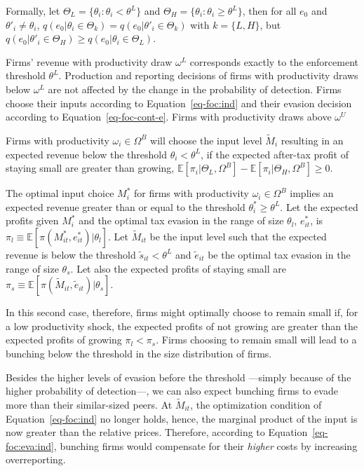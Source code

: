 \documentclass[
  12pt]{article}
\begin{document}
Formally, let \(\Theta_{L} = \{\theta_i : \theta_{i} < \theta^L \}\) and
\(\Theta_{H} = \{\theta_i : \theta_{i} \ge \theta^L \}\), then for all
\(e_0\) and \(\theta'_i\not=\theta_i\),
\(q(e_0|\theta_i \in \Theta_k)=q(e_0|\theta'_i \in \Theta_k)\) with
\(k=\{L,H\}\), but
\(q(e_0|\theta'_i \in \Theta_H)\ge q(e_0|\theta_i \in \Theta_L)\).

Firms' revenue with productivity draw \(\omega^L\) corresponds exactly
to the enforcement threshold \(\theta^L\). Production and reporting
decisions of firms with productivity draws below \(\omega^L\) are not
affected by the change in the probability of detection. Firms choose
their inputs according to Equation~\ref{eq-foc:ind} and their evasion
decision according to Equation~\ref{eq-foc-cont-e}. Firms with
productivity draws above \(\omega^U\)

Firms with productivity \(\omega_{i}\in \Omega^B\) will choose the input
level \(\tilde{M}_{i}\) resulting in an expected revenue below the
threshold \(\theta_{i}<\theta^L\), if the expected after-tax profit of
staying small are greater than growing,
\(\mathbb{E}[\pi_{i}|\Theta_L, \Omega^B]-\mathbb{E}[\pi_{i}|\Theta_H, \Omega^B]\ge0\).

The optimal input choice \(M^*_{i}\) for firms with productivity
\(\omega_i\in\Omega^B\) implies an expected revenue greater than or
equal to the threshold \(\theta^*_{i}\ge \theta^L\). Let the expected
profits given \(M^*_{i}\) and the optimal tax evasion in the range of
size \(\theta_l\), \(e^*_{it}\), is
\(\pi_l\equiv\mathbb{E}[\pi(M^*_{it}, e^*_{it})|\theta_l]\). Let
\(\tilde{M}_{it}\) be the input level such that the expected revenue is
below the threshold \(\tilde{s}_{it}<\theta^L\) and \(\tilde{e}_{it}\)
be the optimal tax evasion in the range of size \(\theta_s\). Let also
the expected profits of staying small are
\(\pi_s\equiv\mathbb{E}[\pi(\tilde{M}_{it},\tilde{e}_{it})|\theta_s]\).

In this second case, therefore, firms might optimally choose to remain
small if, for a low productivity shock, the expected profits of not
growing are greater than the expected profits of growing
\(\pi_l<\pi_s\). Firms choosing to remain small will lead to a bunching
below the threshold in the size distribution of firms.

Besides the higher levels of evasion before the threshold ---simply
because of the higher probability of detection---, we can also expect
bunching firms to evade more than their similar-sized peers. At
\(\tilde{M}_{it}\), the optimization condition of
Equation~\ref{eq-foc:ind} no longer holds, hence, the marginal product
of the input is now greater than the relative prices. Therefore,
according to Equation~\ref{eq-foc:eva:ind}, bunching firms would
compensate for their \emph{higher} costs by increasing overreporting.
\end{document}
